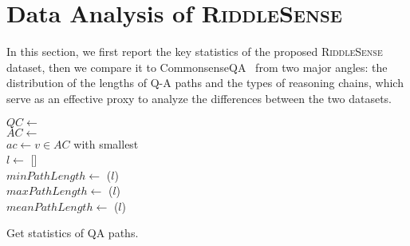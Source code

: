 



\section{Data Analysis of \textsc{RiddleSense}}
\label{sec:dataana}
In this section,
we first report the key statistics of the proposed \textsc{RiddleSense} dataset, 
then we compare it to CommonsenseQA~\cite{Talmor2018CommonsenseQAAQ} from two major angles: the distribution of the lengths of Q-A paths and the types of reasoning chains, which serve as an effective proxy to analyze the differences between the two datasets.


\begin{algorithm}[t]
    \SetAlgoLined
    
    \(QC \gets\) \\
    \(AC \gets\) \\
    \(ac \gets v \in AC\) with smallest \\
    \(l \gets\) []\\
    \(minPathLength \gets\) \FnMin(\(l\))\\
    \(maxPathLength \gets\) \FnMax(\(l\))\\
    \(meanPathLength \gets\) \FnMean(\(l\))
    \caption{Get statistics of QA paths.}
    \label{algo:path-len}
\end{algorithm}


